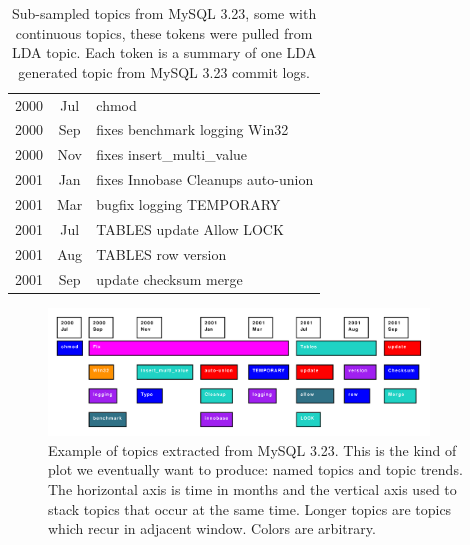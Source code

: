 \documentclass[times, 10pt,twocolumn]{article}
\begin{document}
\begin{table}
\centering
\begin{tabular}{|cc|l|}
\hline
2000 &  Jul &      chmod \\
2000 &  Sep &      fixes benchmark logging Win32 \\
2000 &  Nov &      fixes insert\_multi\_value \\
2001 &  Jan &      fixes Innobase Cleanups auto-union \\
2001 &  Mar &      bugfix logging  TEMPORARY  \\
\hline         
2001 &  Jul &      TABLES update Allow LOCK \\ 
               
2001 &  Aug &      TABLES row version \\
\hline         
2001 &  Sep &      update checksum merge \\
\hline
\end{tabular}
\caption{Sub-sampled topics from MySQL 3.23, some with continuous topics, these tokens were pulled from LDA topic. Each token is a summary of one LDA generated topic from MySQL 3.23 commit logs.}
\label{tab:portability}
\end{table}



\begin{figure}
  \centering
  \includegraphics[width=0.9\textwidth]{lda}
  \caption{Example of topics extracted from MySQL 3.23. This is the kind of plot we eventually want to produce: named topics and topic trends. The horizontal axis is time in months and the vertical axis used to stack topics that occur at the same time. Longer topics are topics which recur in adjacent window. Colors are arbitrary.}
  \label{fig:lda}
\end{figure}
\end{document}
